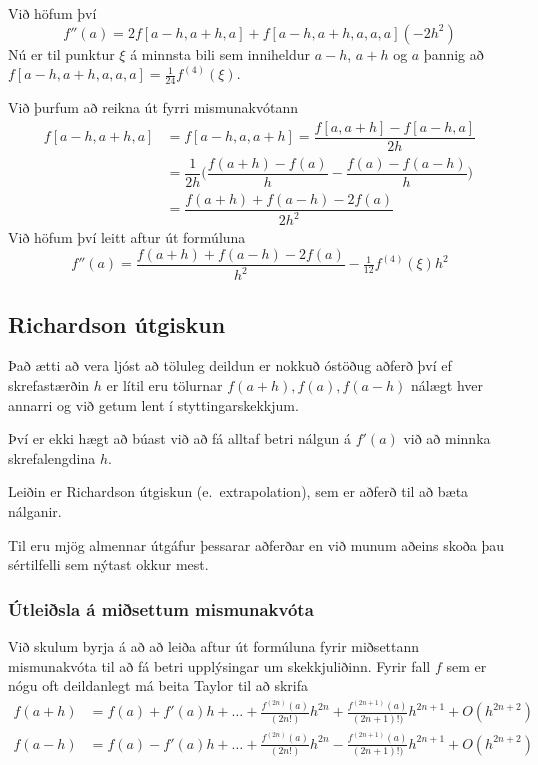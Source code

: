 \documentclass[icelandic,a4paper,12pt]{article}
\begin{document}
Við höfum því 
$$
  f''(a)=2f[a-h,a+h,a]+f[a-h,a+h,a,a,a](-2h^2)
$$
Nú er til punktur $\xi$ á minnsta bili sem inniheldur 
$a-h$, $a+h$ og $a$ þannig að $f[a-h,a+h,a,a,a]=\tfrac
1{24}f^{(4)}(\xi)$.  

\pause
\smallskip
Við þurfum að reikna út fyrri mismunakvótann
\begin{align*}
  f[a-h,a+h,a]&=f[a-h,a,a+h]=\dfrac{f[a,a+h]-f[a-h,a]}{2h}\\
  &=\dfrac 1{2h}\bigg(\dfrac{f(a+h)-f(a)}h-\dfrac{f(a)-f(a-h)}h\bigg)\\
  &=\dfrac{f(a+h)+f(a-h)-2f(a)}{2h^2}  
\end{align*}
Við höfum því leitt aftur út formúluna
$$
  f''(a)=\dfrac{f(a+h)+f(a-h)-2f(a)}{h^2}-\tfrac
  1{12}f^{(4)}(\xi)h^2
$$



\subsection{Richardson útgiskun} 

Það ætti að vera ljóst að töluleg deildun er nokkuð óstöðug aðferð því
ef skrefastærðin $h$ er lítil eru tölurnar $f(a+h), f(a), f(a-h)$
nálægt hver annarri og við getum lent í styttingarskekkjum. 

\pause
\smallskip
Því er ekki hægt að búast við að fá alltaf betri nálgun á $f'(a)$ við að
minnka skrefalengdina $h$. 

\pause
\smallskip
Leiðin  er Richardson útgiskun (e.~extrapolation), sem er aðferð til
að bæta nálganir.

\pause
\smallskip
Til eru mjög almennar útgáfur þessarar aðferðar en
við munum aðeins skoða þau sértilfelli sem nýtast okkur mest.



\subsubsection{Útleiðsla á miðsettum mismunakvóta} 
Við skulum byrja á að að leiða aftur út formúluna fyrir miðsettann
mismunakvóta til að fá betri upplýsingar um skekkjuliðinn. Fyrir fall
$f$ sem er nógu oft deildanlegt má beita Taylor til að skrifa 
{\small\begin{align*}
  f(a+h) &= f(a) + f'(a)h %
  + \ldots
  + \frac{f^{(2n)}(a)}{(2n!)}h^{2n}
  + \frac{f^{(2n+1)}(a)}{(2n+1)!)}h^{2n+1} + O(h^{2n+2}) \\
  f(a-h) &= f(a) - f'(a)h 
  + \ldots
  + \frac{f^{(2n)}(a)}{(2n!)}h^{2n}
  - \frac{f^{(2n+1)}(a)}{(2n+1)!)}h^{2n+1} + O(h^{2n+2})
\end{align*}}
\end{document}
